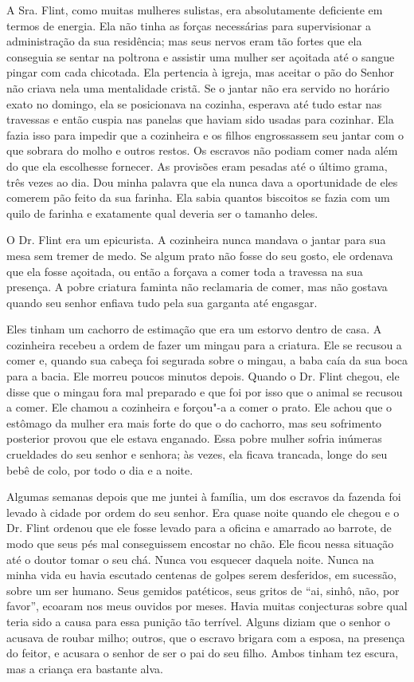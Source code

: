 A Sra. Flint, como muitas mulheres
sulistas, era absolutamente deficiente em termos de energia. Ela não
tinha as forças necessárias para supervisionar a administração da sua
residência; mas seus nervos eram tão fortes que ela conseguia se sentar
na poltrona e assistir uma mulher ser açoitada até o sangue pingar com
cada chicotada. Ela pertencia à igreja, mas aceitar o pão do Senhor não
criava nela uma mentalidade cristã. Se o jantar não era servido no
horário exato no domingo, ela se posicionava na cozinha, esperava até
tudo estar nas travessas e então cuspia nas panelas que haviam sido
usadas para cozinhar. Ela fazia isso para impedir que a cozinheira e os
filhos engrossassem seu jantar com o que sobrara do molho e outros
restos. Os escravos não podiam comer nada além do que ela escolhesse
fornecer. As provisões eram pesadas até o último grama, três vezes ao
dia. Dou minha palavra que ela nunca dava a oportunidade de eles comerem
pão feito da sua farinha. Ela sabia quantos biscoitos se fazia com um
quilo de farinha e exatamente qual deveria ser o tamanho deles.

O Dr. Flint era um epicurista. A
cozinheira nunca mandava o jantar para sua mesa sem tremer de medo. Se
algum prato não fosse do seu gosto, ele ordenava que ela fosse açoitada,
ou então a forçava a comer toda a travessa na sua presença. A pobre
criatura faminta não reclamaria de comer, mas não gostava quando seu
senhor enfiava tudo pela sua garganta até engasgar.

Eles tinham um cachorro de estimação
que era um estorvo dentro de casa. A cozinheira recebeu a ordem de fazer
um mingau para a criatura. Ele se recusou a comer e, quando sua cabeça
foi segurada sobre o mingau, a baba caía da sua boca para a bacia. Ele
morreu poucos minutos depois. Quando o Dr. Flint chegou, ele disse que o
mingau fora mal preparado e que foi por isso que o animal se recusou a
comer. Ele chamou a cozinheira e forçou"-a a comer o prato. Ele achou que
o estômago da mulher era mais forte do que o do cachorro, mas seu
sofrimento posterior provou que ele estava enganado. Essa pobre mulher
sofria inúmeras crueldades do seu senhor e senhora; às vezes, ela ficava
trancada, longe do seu bebê de colo, por todo o dia e a noite.

Algumas semanas depois que me juntei à
família, um dos escravos da fazenda foi levado à cidade por ordem do seu
senhor. Era quase noite quando ele chegou e o Dr. Flint
ordenou que ele fosse levado para
a oficina e amarrado ao barrote, de modo que seus pés mal conseguissem
encostar no chão. Ele ficou nessa situação até o doutor tomar o seu chá.
Nunca vou esquecer daquela noite. Nunca na minha vida eu havia escutado
centenas de golpes serem desferidos, em sucessão, sobre um ser humano.
Seus gemidos patéticos, seus gritos de ``ai, sinhô, não, por favor'',
ecoaram nos meus ouvidos por meses. Havia muitas conjecturas sobre qual
teria sido a causa para essa punição tão terrível. Alguns diziam que o
senhor o acusava de roubar milho; outros, que o escravo brigara com a
esposa, na presença do feitor, e acusara o senhor de ser o pai do seu
filho. Ambos tinham tez escura, mas a criança era bastante alva.

